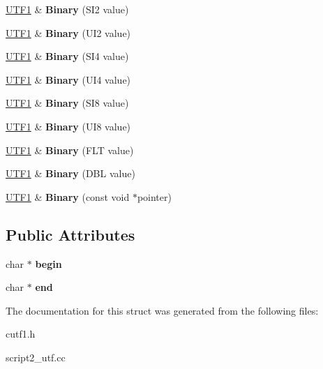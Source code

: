 \begin{DoxyCompactItemize}
\mbox{\hyperlink{struct___1_1_u_t_f1}{U\+T\+F1}} \& {\bfseries Binary} (S\+I2 value)
\item 
\mbox{\label{struct___1_1_u_t_f1_ab8dab2b3b096a5a195b88ec5cde40d57}} 
\mbox{\hyperlink{struct___1_1_u_t_f1}{U\+T\+F1}} \& {\bfseries Binary} (U\+I2 value)
\item 
\mbox{\label{struct___1_1_u_t_f1_afb5c8bd995f7cfe9978302204848dd1c}} 
\mbox{\hyperlink{struct___1_1_u_t_f1}{U\+T\+F1}} \& {\bfseries Binary} (S\+I4 value)
\item 
\mbox{\label{struct___1_1_u_t_f1_a2c33327c9edbab8368e03fb96d6aa43a}} 
\mbox{\hyperlink{struct___1_1_u_t_f1}{U\+T\+F1}} \& {\bfseries Binary} (U\+I4 value)
\item 
\mbox{\label{struct___1_1_u_t_f1_a5dbf6df17c26073995aab00f13dac37a}} 
\mbox{\hyperlink{struct___1_1_u_t_f1}{U\+T\+F1}} \& {\bfseries Binary} (S\+I8 value)
\item 
\mbox{\label{struct___1_1_u_t_f1_a4c5d98d70695a89f6967a54c4c33bb23}} 
\mbox{\hyperlink{struct___1_1_u_t_f1}{U\+T\+F1}} \& {\bfseries Binary} (U\+I8 value)
\item 
\mbox{\label{struct___1_1_u_t_f1_a3a68b3b28f1bae0f61f95529d5bc2b45}} 
\mbox{\hyperlink{struct___1_1_u_t_f1}{U\+T\+F1}} \& {\bfseries Binary} (F\+LT value)
\item 
\mbox{\label{struct___1_1_u_t_f1_a94f60b89bc73947589700b4cf23994e1}} 
\mbox{\hyperlink{struct___1_1_u_t_f1}{U\+T\+F1}} \& {\bfseries Binary} (D\+BL value)
\item 
\mbox{\label{struct___1_1_u_t_f1_a987b52f2e3707b8b2bd6befd03fd567c}} 
\mbox{\hyperlink{struct___1_1_u_t_f1}{U\+T\+F1}} \& {\bfseries Binary} (const void $\ast$pointer)
\end{DoxyCompactItemize}
\subsection*{Public Attributes}
\begin{DoxyCompactItemize}
\item 
\mbox{\label{struct___1_1_u_t_f1_a74b5cb45155d78d9893712dd42204f16}} 
char $\ast$ {\bfseries begin}
\item 
\mbox{\label{struct___1_1_u_t_f1_a837b875819850938844feb52a6629c85}} 
char $\ast$ {\bfseries end}
\end{DoxyCompactItemize}


The documentation for this struct was generated from the following files\+:\begin{DoxyCompactItemize}
\item 
cutf1.\+h\item 
script2\+\_\+utf.\+cc\end{DoxyCompactItemize}
